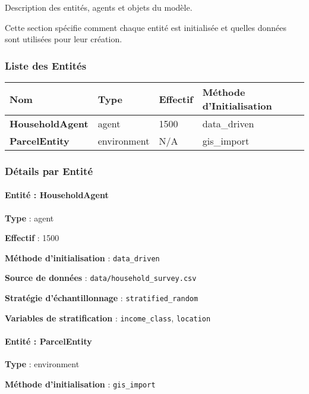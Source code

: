 \documentclass[
]{article}
\begin{document}
Description des entités, agents et objets du modèle.

Cette section spécifie comment chaque entité est initialisée et quelles
données sont utilisées pour leur création.

\subsubsection{Liste des Entités}\label{liste-des-entituxe9s}

\begin{longtable}[]{@{}llll@{}}
\toprule\noalign{}
\textbf{Nom} & \textbf{Type} & \textbf{Effectif} & \textbf{Méthode
d'Initialisation} \\
\midrule\noalign{}
\endhead
\bottomrule\noalign{}
\endlastfoot
\textbf{HouseholdAgent} & agent & 1500 & data\_driven \\
\textbf{ParcelEntity} & environment & N/A & gis\_import \\
\end{longtable}

\subsubsection{Détails par Entité}\label{duxe9tails-par-entituxe9}

\paragraph{Entité : HouseholdAgent}\label{entituxe9-householdagent}

\textbf{Type} : agent

\textbf{Effectif} : 1500

\textbf{Méthode d'initialisation} : \texttt{data\_driven}

\textbf{Source de données} : \texttt{data/household\_survey.csv}

\textbf{Stratégie d'échantillonnage} : \texttt{stratified\_random}

\textbf{Variables de stratification} : \texttt{income\_class},
\texttt{location}

\paragraph{Entité : ParcelEntity}\label{entituxe9-parcelentity}

\textbf{Type} : environment

\textbf{Méthode d'initialisation} : \texttt{gis\_import}
\end{document}
